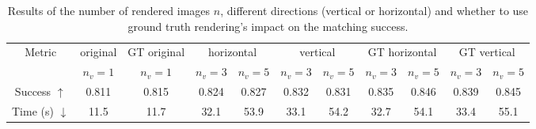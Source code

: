 \begin{table}[tb]
    \renewcommand{\arraystretch}{1.2} %
    \centering
    \begin{tabular}{c cc cc cc cc cc}
        \hline
        \multirow{2}{*}{Metric} & original & GT original & \multicolumn{2}{c}{horizontal} & \multicolumn{2}{c}{vertical} & \multicolumn{2}{c}{GT horizontal} & \multicolumn{2}{c}{GT vertical} \\
        \cline{2-11}
        & $n_v=1$ & $n_v=1$ & $n_v=3$ & $n_v=5$ & $n_v=3$ & $n_v=5$ & $n_v=3$ & $n_v=5$ & $n_v=3$ & $n_v=5$ \\
        \hline
        Success $\uparrow$ & 0.811 & 0.815 & 0.824 & 0.827 & 0.832 & 0.831 & 0.835 & 0.846 & 0.839 & 0.845 \\
        Time (s) $\downarrow$ & 11.5 & 11.7 & 32.1 & 53.9 & 33.1 & 54.2 & 32.7 & 54.1 & 33.4 & 55.1 \\
        \hline
    \end{tabular}
    \vspace{5pt}
    \caption{Results of the number of rendered images $n$, different directions (vertical or horizontal) and whether to use ground truth rendering's impact on the matching success.}
    \vspace{-16pt}
    \label{tab:NVS}
\end{table}


